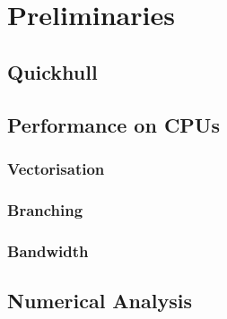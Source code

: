 \section{Preliminaries}

\subsection{Quickhull}

\subsection{Performance on CPUs}

\subsubsection{Vectorisation}

\subsubsection{Branching}

\subsubsection{Bandwidth}

\subsection{Numerical Analysis}


